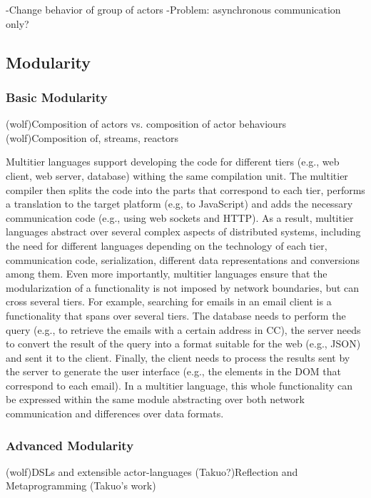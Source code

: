 \documentclass[
graybox,
envcountchap,
]{svmult}
\begin{document}
\begin{bibunit}
-Change behavior of group of actors
-Problem: asynchronous communication only?

\subsection{Modularity}
\label{sub:sec:mod}

\subsubsection{Basic Modularity}
\label{sub:sec:mod-basic}
(wolf)Composition of actors vs. composition of actor behaviours
(wolf)Composition of, streams, reactors

Multitier languages support developing the code for different tiers 
(e.g., web client, web server, database) withing the same compilation unit.
The multitier compiler then splits the code into the parts that 
correspond to each tier, performs a translation to the target platform 
(e.g, to JavaScript) and adds the necessary communication code 
(e.g., using web sockets and HTTP). As a result, multitier languages 
abstract over several complex aspects of distributed systems,
including the need for different languages depending on the technology 
of each tier, communication code, serialization, different data 
representations and conversions among them.
%
Even more importantly, multitier languages ensure that the 
modularization of a functionality is not imposed by network boundaries,
but can cross several tiers. For example, searching for emails 
in an email client is a functionality that spans over several tiers.
The database needs to perform the query (e.g., to retrieve the emails
with a certain address in CC), the server needs to convert the result 
of the query into a format suitable for the web (e.g., JSON) and 
sent it to the client. Finally, the client needs to process the 
results sent by the server to generate the user interface 
(e.g., the elements in the DOM that correspond to each email).
In a multitier language, this whole functionality can be expressed within
the same module abstracting over both network communication and 
differences over data formats.




\subsubsection{Advanced Modularity}
\label{sub:sec:mod-adv}
(wolf)DSLs and extensible actor-languages
(Takuo?)Reflection and Metaprogramming (Takuo’s work)


\end{bibunit}
\end{document}
